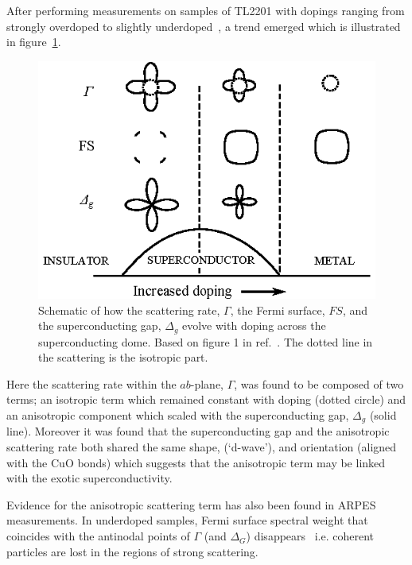 After performing measurements on samples of \ac{TL2201} with dopings ranging from strongly overdoped to slightly underdoped~\cite{Abdel-Jawad2006}, a trend emerged which is illustrated in figure~\ref{Fig:Intro:AnisotropyPhase}. 
\begin{figure}[htbp]
    \begin{center}
        \includegraphics[scale=1.2]{Chapter-Introduction/Figures/AnisotropyPhase/AnisotropyPhase}
        \caption{Schematic of how the scattering rate, $\Gamma$, the Fermi surface, $FS$, and the superconducting gap, $\Delta_g$ evolve with doping across the superconducting dome. Based on figure 1 in ref.~\cite{Taillefer2006}. The dotted line in the scattering is the isotropic part.}
        \label{Fig:Intro:AnisotropyPhase}
    \end{center}
\end{figure}
Here the scattering rate within the $ab$-plane, $\Gamma$, was found to be composed of two terms; an isotropic term which remained constant with doping (dotted circle) and an anisotropic component which scaled with the superconducting gap, $\Delta_g$ (solid line). Moreover it was found that the superconducting gap and the anisotropic scattering rate both shared the same shape, (`d-wave'), and orientation (aligned with the CuO bonds) which suggests that the anisotropic term may be linked with the exotic superconductivity. 

Evidence for the anisotropic scattering term has also been found in \ac{ARPES} measurements. In underdoped samples, Fermi surface spectral weight that coincides with the antinodal points of $\Gamma$ (and $\Delta_G$) disappears~\cite{Norman2010} i.e. coherent particles are lost in the regions of strong scattering.


